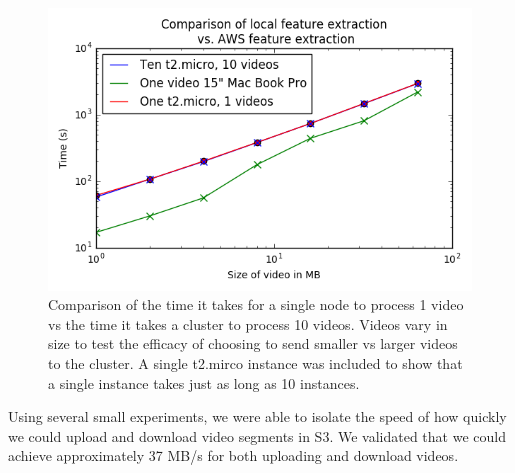 \begin{figure}[h]
  \centering
  \includegraphics[width=\columnwidth]{figures/aws_vs_local.png}
  \caption{Comparison of the time it takes for a single node to process 1 video
  vs the time it takes a cluster to process 10 videos. Videos vary in size to
  test the efficacy of choosing to send smaller vs larger videos to the cluster.
  A single t2.mirco instance was included to show that a single instance takes
  just as long as 10 instances.}
  \label{fig:size_matters}
\end{figure}

Using several small experiments, we were able to isolate the speed of how
quickly we could upload and download video segments in S3. We validated that we
could achieve approximately 37 MB/s for both uploading and download videos.




